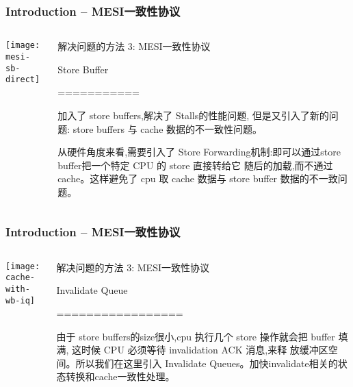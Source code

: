\begin{frame}[plain]	
    \frametitle{Introduction -- MESI一致性协议}
    
    
    \begin{columns}
        
        \begin{column}{.4\textwidth}
            \texttt{[image: mesi-sb-direct]}
        \end{column}
        \begin{column}{.6\textwidth}
            解决问题的方法 3: MESI一致性协议
       
            Store Buffer
            
            ===========
                        
            加入了 store buffers,解决了 Stalls的性能问题, 但是又引入了新的问题:
            store buffers 与 cache 数据的不一致性问题。
            
            从硬件角度来看,需要引入了
            Store Forwarding机制:即可以通过store buffer把一个特定 CPU 的 store 直接转给它
            随后的加载,而不通过 cache。这样避免了 cpu 取 cache 数据与
            store buffer 数据的不一致问题。
            
            
            
        \end{column}
    \end{columns}
    
\end{frame}

\begin{frame}[plain]	
    \frametitle{Introduction -- MESI一致性协议}
    
    
    \begin{columns}
        
        \begin{column}{.4\textwidth}
            \texttt{[image: cache-with-wb-iq]}
        \end{column}
        \begin{column}{.6\textwidth}
            解决问题的方法 3: MESI一致性协议
            
            Invalidate  Queue
            
            =================
            
            由于 store buffers的size很小,cpu 执行几个 store 操作就会把
            buffer 填满, 这时候 CPU 必须等待 invalidation ACK 消息,来释
            放缓冲区空间。所以我们在这里引入 Invalidate  Queues。加快invalidate相关的状态转换和cache一致性处理。
            
            
            
            
        \end{column}
    \end{columns}
    
\end{frame}



